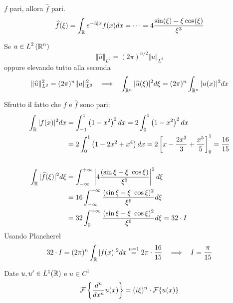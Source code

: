 $f$ pari, allora $\hat{f}$ pari.
\begin{equation*}
\widehat{f}(\xi) = \int _{\mathbb{R} } e^{ - i\xi x} f(x) dx = \cdots = 4\frac{\sin(\xi) - \xi \cos(\xi)}{\xi ^{3}}
\end{equation*}
\begin{thm}
 Se $\displaystyle u\in L^{2}\left(\mathbb{R} ^{n}\right)$
\begin{equation*}
\Vert \hat{u}\Vert _{L^{2}} = (2\pi)^{n/2}\Vert u\Vert _{L^{2}}
\end{equation*}
oppure elevando tutto alla seconda
\begin{equation*}
\Vert \hat{u}\Vert ^{2}_{L^{2}} = (2\pi)^{n}\Vert u\Vert ^{2}_{L^{2}} \ \ \implies \ \ \int _{\RR ^{n}}| \hat{u}(\xi)| ^{2} d\xi = (2\pi)^{n}\int _{\RR ^{n}}| u(x)| ^{2} dx
\end{equation*}
\end{thm}
Sfrutto il fatto che $f$ e $\hat{f}$ sono pari:
\begin{align*}
\int _{\mathbb{R} }| f(x)| ^{2} dx & = \int ^{1}_{ - 1}\left(1 - x^{2}\right)^{2} dx = 2\int ^{1}_{0}\left(1 - x^{2}\right)^{2} dx\\
 & = 2\int ^{1}_{0}\left(1 - 2x^2 + x^{4}\right) dx = 2\left[ x - \frac{2x^{3}}{3} + \frac{x^{5}}{5}\right]^{1}_{0} = \frac{16}{15}\\
 & \\
\int _{\mathbb{R} }| \widehat{f}(\xi)| ^{2} d\xi  & = \int ^{ + \infty }_{ - \infty }\left| 4\frac{(\sin \xi - \xi \ \cos \xi)}{\xi ^{3}}\right| ^{2} d\xi \\
 & = 16\int ^{ + \infty }_{ - \infty }\frac{(\sin \xi - \xi \ \cos \xi)^{2}}{\xi ^{6}} d\xi \\
 & = 32\int ^{ + \infty }_{0}\frac{(\sin \xi - \xi \ \cos \xi)^{2}}{\xi ^{6}} d\xi = 32\cdot I
\end{align*}
Usando Plancherel
\begin{equation*}
32\cdot I = (2\pi)^{n}\int _{\mathbb{R} }| f(x)| ^{2} dx\overset{n = 1}{ = } 2\pi \cdot \frac{16}{15} \ \ \implies \ \ I = \frac{\pi }{15}
\end{equation*}
\Soluzione
\begin{thm}
 Date $u,u'\in L^{1}(\mathbb{R})$ e $u\in C^{1}$
\begin{equation*}
\mathcal{F} \left\{\frac{d^{n}}{dx^{n}} u(x)\right\} = (i\xi)^{n} \cdot \mathcal{F} \{u(x)\}
\end{equation*}
\end{thm}
